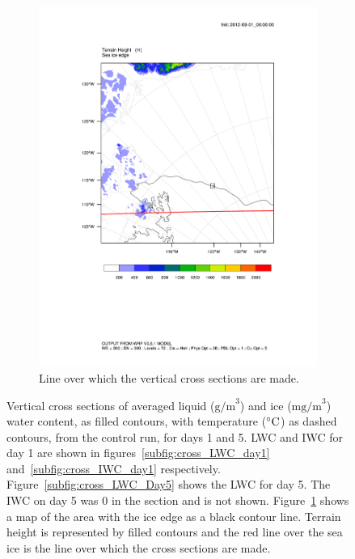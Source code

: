 \begin{figure}
\begin{subfigure}{0.48\textwidth}
        \includegraphics[width=\textwidth]{results/control/crossSec_line.pdf}
        \caption{Line over which the vertical cross sections are made.}
        \label{subfig:cross_line}
    \end{subfigure}
    \caption{Vertical cross sections of averaged liquid ($\text{g/m}^3$) and ice  ($\text{mg/m}^3$) water content, as filled contours, with temperature ($\degree\text{C}$) as dashed contours, from the control run, for days 1 and 5. LWC and IWC for day 1 are shown in figures~\ref{subfig:cross_LWC_day1} and~\ref{subfig:cross_IWC_day1} respectively. Figure~\ref{subfig:cross_LWC_Day5} shows the LWC for day 5. The IWC on day 5 was 0 in the section and is not shown. Figure~\ref{subfig:cross_line} shows a map of the area with the ice edge as a black contour line. Terrain height is represented by filled contours and the red line over the sea ice is the line over which the cross sections are made.}
    \label{fig:sections}
\end{figure}

